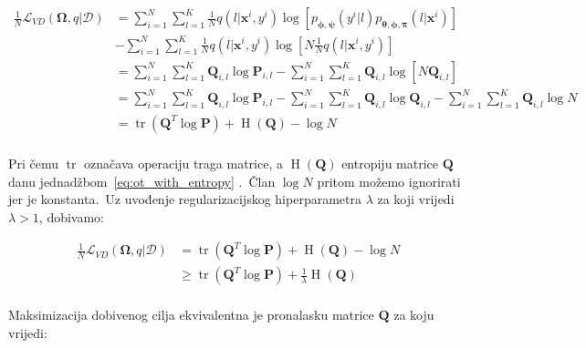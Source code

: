 \documentclass[diplomskirad]{fer}
\begin{document}
\begin{equation}
  \begin{aligned}
    \frac{1}{N} \mathcal{L}_{VD}(\bm{\Omega}, q | \mathcal{D}) &= \sum_{i=1}^{N} \sum_{l=1}^{K} \frac{1}{N} q(l | \bm{x}^i, y^i) \log \left[p_{\bm{\phi}, \bm{\psi}}(y^i | l) p_{\bm{\theta}, \bm{\phi}, \bm{\pi}}(l | \bm{x}^i) \right] \\ 
                                                               &- \sum_{i=1}^{N} \sum_{l=1}^{K} \frac{1}{N} q(l | \bm{x}^i, y^i) \log \left[N \frac{1}{N} q(l | \bm{x}^i, y^i) \right] \\ 
                                                               &= \sum_{i=1}^{N} \sum_{l=1}^{K} \bm{Q}_{i, l} \log \bm{P}_{i, l} - \sum_{i=1}^{N} \sum_{l=1}^{K} \bm{Q}_{i, l} \log \left[N \bm{Q}_{i, l} \right] \\ 
                                                               &= \sum_{i=1}^{N} \sum_{l=1}^{K} \bm{Q}_{i, l} \log \bm{P}_{i, l} - \sum_{i=1}^{N} \sum_{l=1}^{K} \bm{Q}_{i, l} \log \bm{Q}_{i, l} - \sum_{i=1}^{N} \sum_{l=1}^{K} \bm{Q}_{i, l} \log N \\ 
                                                               &= \operatorname{tr}(\bm{Q}^T \log \bm{P}) + \operatorname{H}(\bm{Q}) - \log N \\ 
  \end{aligned}
  \label{eq:vibe_e_step_matrices}
\end{equation}

Pri čemu $\operatorname{tr}$ označava operaciju traga matrice, a $\operatorname{H}(\bm{Q})$ entropiju matrice $\bm{Q}$ danu jednadžbom~\ref{eq:ot_with_entropy} .\ Član $\log N$ pritom možemo ignorirati jer je konstanta.\ 
Uz uvođenje regularizacijskog hiperparametra $\lambda$ za koji vrijedi $\lambda > 1$, dobivamo:

\begin{equation}
  \begin{aligned}
    \frac{1}{N} \mathcal{L}_{VD}(\bm{\Omega}, q | \mathcal{D}) &= \operatorname{tr}(\bm{Q}^T \log \bm{P}) + \operatorname{H}(\bm{Q}) - \log N \\ 
                                                               &\geq \operatorname{tr}(\bm{Q}^T \log \bm{P}) + \frac{1}{\lambda} \operatorname{H}(\bm{Q}) \\ 
  \end{aligned}
  \label{eq:vibe_e_step_final_eq}
\end{equation}

Maksimizacija dobivenog cilja ekvivalentna je pronalasku matrice $\bm{Q}$ za koju vrijedi:
\end{document}
